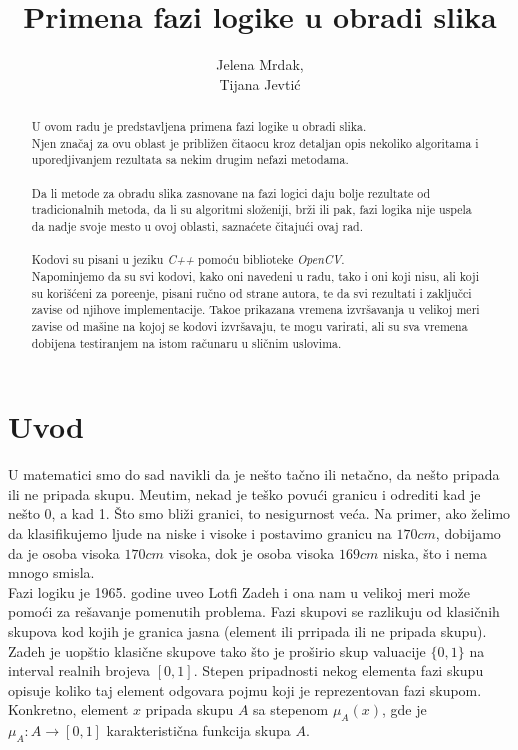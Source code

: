 \documentclass[12pt,a4paper]{article}
\title{Primena fazi logike u obradi slika}
\author{Jelena Mrdak,\\ Tijana Jevti\' c}
\theoremstyle{definition}
\theoremstyle{remark}
\theoremstyle{plain}
\begin{document}
\maketitle

\begin{abstract}
  U ovom radu je predstavljena primena fazi logike u obradi slika. \\
  Njen zna\v caj za ovu oblast je pribli\v zen \v citaocu kroz detaljan opis nekoliko algoritama i uporedjivanjem rezultata sa nekim drugim nefazi metodama.\\ \\
  Da li metode za obradu slika zasnovane na fazi logici daju bolje rezultate od tradicionalnih metoda, da li su algoritmi slo\v zeniji, br\v zi ili pak,
  fazi logika nije uspela da nadje svoje mesto u ovoj oblasti, sazna\' cete \v citaju\' ci ovaj rad. \\ \\
  Kodovi su pisani u jeziku \textit{C++} pomo\' cu biblioteke \textit{OpenCV}. \\
  Napominjemo da su svi kodovi, kako oni navedeni u radu, tako i oni koji nisu, ali koji su kori\v s\' ceni za pore\dj enje, pisani ru\v cno od strane autora, te da svi rezultati i zaklju\v cci zavise od njihove implementacije. Tako\dj e prikazana vremena izvr\v savanja u velikoj meri zavise od ma\v sine na kojoj se kodovi izvr\v savaju, te mogu varirati, ali su sva vremena dobijena testiranjem na istom ra\v cunaru u sli\v cnim uslovima.
\end{abstract}

\newpage
\tableofcontents

\newpage
\section{Uvod}
U matematici smo do sad navikli da je ne\v sto ta\v cno ili neta\v cno, da ne\v sto pripada ili ne pripada skupu. Me\dj utim, nekad je te\v sko povu\' ci granicu i odrediti kad je ne\v sto 0, a kad 1. \v Sto smo bli\v zi granici, to nesigurnost ve\' ca. Na primer, ako \v zelimo da klasifikujemo ljude na niske i visoke i postavimo granicu na $170 cm$, dobijamo da je osoba visoka $170 cm$ visoka, dok je osoba visoka $169 cm$ niska, \v sto i nema mnogo smisla.\\

Fazi logiku je 1965. godine uveo Lotfi Zadeh i ona nam u velikoj meri mo\v ze pomo\' ci za re\v savanje pomenutih problema. Fazi skupovi se razlikuju od klasi\v cnih skupova kod kojih je granica jasna (element ili prripada ili ne pripada skupu). Zadeh je uop\v stio klasi\v cne skupove tako \v sto je pro\v sirio skup valuacije $\{0, 1\}$ na interval realnih brojeva $[0, 1]$. Stepen pripadnosti nekog elementa fazi skupu opisuje koliko taj element odgovara pojmu koji je reprezentovan fazi skupom. Konkretno, element $x$ pripada skupu $A$ sa stepenom $\mu_{A}(x)$, gde je $\mu_{A} : A \rightarrow [0, 1]$ karakteristi\v cna funkcija skupa $A$.\\
\end{document}
